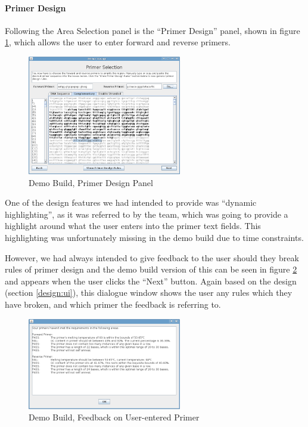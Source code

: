 
\paragraph{Primer Design}

Following the Area Selection panel is the ``Primer Design'' panel,
shown in figure \ref{fig:demoBuild:primerDesign}, which allows the
user to enter forward and reverse primers.

\begin{figure}[h]
  \begin{center}
    \includegraphics[width=0.6\textwidth]{./images/demoBuild/primerDesign.png}
    \caption{
      \label{fig:demoBuild:primerDesign}
      Demo Build, Primer Design Panel
    }
  \end{center}
\end{figure}

One of the design features we had intended to provide was ``dynamic
highlighting'', as it was referred to by the team, which was going to
provide a highlight around what the user enters into the primer text
fields.
This highlighting was unfortunately missing in the demo build due to
time constraints.

However, we had always intended to give feedback to the user should
they break rules of primer design and the demo build version of this
can be seen in figure \ref{fig:demoBuild:primerFeedback} and appears
when the user clicks the ``Next'' button.
Again based on the design (section \ref{design:ui}), this dialogue
window shows the user any rules which they have broken, and which
primer the feedback is referring to.

\begin{figure}[h]
  \begin{center}
    \includegraphics[width=0.6\textwidth]{./images/demoBuild/primerFeedback.png}
    \caption{
      \label{fig:demoBuild:primerFeedback}
      Demo Build, Feedback on User-entered Primer
    }
  \end{center}
\end{figure}

